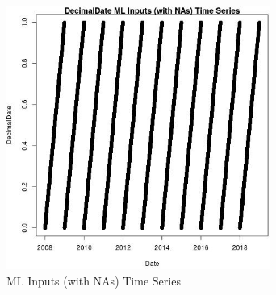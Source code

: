 \begin{figure} 
\centering  
\includegraphics[width=0.77\textwidth]{Code_Outputs/Report_ML_input_PM25_Step4_part_e_de_duplicated_aveswNAs_DecimalDatevDate.jpg} 
\caption{\label{fig:Report_ML_input_PM25_Step4_part_e_de_duplicated_aveswNAsDecimalDatevDate}ML Inputs (with NAs) Time Series} 
\end{figure} 
 
